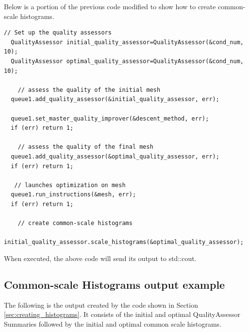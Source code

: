  Below is a portion of the previous code modified to show how to create common-scale histograms.
\begin{lstlisting}[frame=single]
    // Set up the quality assessors
  QualityAssessor initial_quality_assessor=QualityAssessor(&cond_num, 10);
  QualityAssessor optimal_quality_assessor=QualityAssessor(&cond_num, 10);

    // assess the quality of the initial mesh
  queue1.add_quality_assessor(&initial_quality_assessor, err);

  queue1.set_master_quality_improver(&descent_method, err);
  if (err) return 1;

    // assess the quality of the final mesh
  queue1.add_quality_assessor(&optimal_quality_assessor, err);
  if (err) return 1;

   // launches optimization on mesh
  queue1.run_instructions(&mesh, err);
  if (err) return 1;

    // create common-scale histograms
  initial_quality_assessor.scale_histograms(&optimal_quality_assessor);
\end{lstlisting}

When executed, the above code will send its output to std::cout.

\clearpage
\subsection{Common-scale Histograms output example}

The following is the output created by the code shown in Section \ref{sec:creating_histograms}.  It consists of the initial and optimal QualityAssessor Summaries followed by the initial and optimal common scale histograms. 

